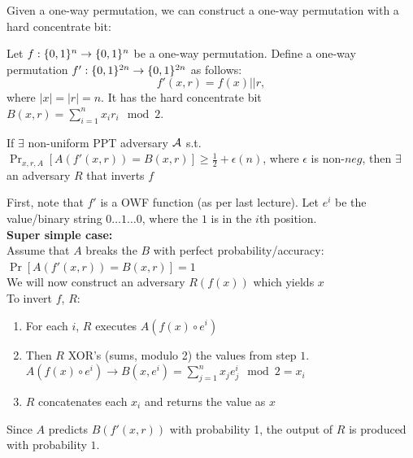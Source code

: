 \documentclass[12pt]{tufte-book}
\begin{document}
\bigskip
Given a one-way permutation, we can construct a one-way permutation with a hard concentrate bit:
\begin{theorem}
Let  $f:\{0,1\}^{n} \rightarrow \{0,1\}^{n}$ be a one-way permutation.
Define a one-way permutation $f':\{0,1\}^{2n} \rightarrow \{0,1\}^{2n}$ as follows:
$$f'(x,r) = f(x) || r,$$
where $|x| = |r| =n$. It has the hard concentrate bit $B(x, r) = \sum_{i=1}^n x_i r_i\mod 2$.
\end{theorem}
\proof
{}
If $\exists$ non-uniform PPT adversary $\mathcal{A}$ s.t. $\Pr_{x,r,A}[A(f'(x,r)) = B(x,r)] \ge \frac{1}{2} + \epsilon(n)$, where $\epsilon$ is non-$neg$, then $\exists$ an adversary $R$ that inverts $f$

	First, note that $f'$ is a OWF function (as per last lecture).  Let $e^i$ be the value/binary string $0\ldots1\ldots0$, where the $1$ is in the $i$th position.\\

\textbf{Super simple case:}\\
	Assume that $A$ breaks the $B$ with perfect probability/accuracy: $\Pr[A(f'(x,r)) = B(x,r)] = 1$\\
	We will now construct an adversary $R(f(x))$ which yields $x$\\
	To invert $f$, $R$:
	\begin{enumerate}
		\item For each $i$, $R$ executes $A(f(x) \circ e^i)$
		\item Then $R$ XOR's (sums, modulo 2) the values from step $1$.  $A(f(x) \circ e^i) \rightarrow B(x, e^i) = \sum_{j=1}^n x_j e_j^i \mod 2  = x_i$
		\item $R$ concatenates each $x_i$ and returns the value as $x$
	\end{enumerate}
	Since $A$ predicts $B(f'(x,r))$ with probability 1, the output of $R$ is produced with probability $1$.\\
\end{document}
